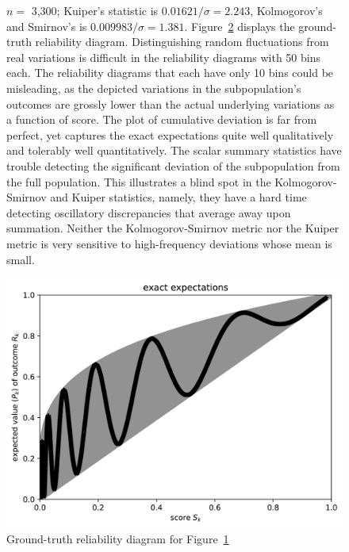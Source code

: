 \documentclass{article}
\begin{document}
\begin{figure}
\begin{centering}
\end{centering}
\caption{$n =$ 3,300;
         Kuiper's statistic is $0.01621 / \sigma = 2.243$,
         Kolmogorov's and Smirnov's is $0.009983 / \sigma = 1.381$.
Figure~\ref{3300e} displays the ground-truth reliability diagram.
Distinguishing random fluctuations from real variations
is difficult in the reliability diagrams with 50 bins each.
The reliability diagrams that each have only 10 bins could be misleading,
as the depicted variations in the subpopulation's outcomes are grossly
lower than the actual underlying variations as a function of score.
The plot of cumulative deviation is far from perfect, yet captures
the exact expectations quite well qualitatively
and tolerably well quantitatively.
The scalar summary statistics have trouble
detecting the significant deviation of the subpopulation
from the full population.
This illustrates a blind spot in the Kolmogorov-Smirnov and Kuiper statistics,
namely, they have a hard time detecting oscillatory discrepancies
that average away upon summation. Neither the Kolmogorov-Smirnov metric
nor the Kuiper metric is very sensitive to high-frequency deviations
whose mean is small.
}
\label{3300}
\end{figure}

\begin{figure}
\begin{centering}

\parbox{\imsize}{\includegraphics[width=\imsize]
                {./codes/unweighted/50000_3300_10_2/exact.jpg}}

\end{centering}
\caption{Ground-truth reliability diagram for Figure~\ref{3300}}
\label{3300e}
\end{figure}
\end{document}
